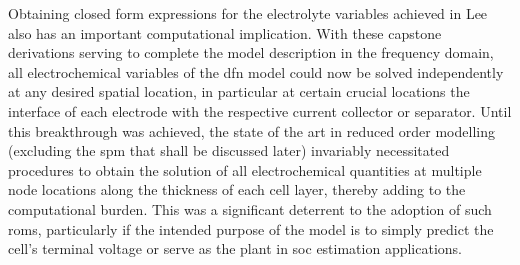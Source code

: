 Obtaining  closed form  expressions for  the electrolyte  variables achieved  in
Lee~\etal{} also has an important computational implication. With these capstone
derivations serving to  complete the model description in  the frequency domain,
all  electrochemical  variables of  the  \gls{dfn}  model  could now  be  solved
independently at any desired spatial  location, in particular at certain crucial
locations  \eg{} the  interface of  each electrode  with the  respective current
collector or separator.  Until this breakthrough was achieved, the  state of the
art in reduced order modelling (excluding  the \gls{spm} that shall be discussed
later)  invariably  necessitated  procedures  to  obtain  the  solution  of  all
electrochemical quantities  at multiple  node locations  along the  thickness of
each  cell  layer, thereby  adding  to  the  computational  burden. This  was  a
significant deterrent to  the adoption of such \glspl{rom},  particularly if the
intended purpose of  the model is to simply predict  the cell's terminal voltage
or serve as the plant in \gls{soc} estimation applications.


